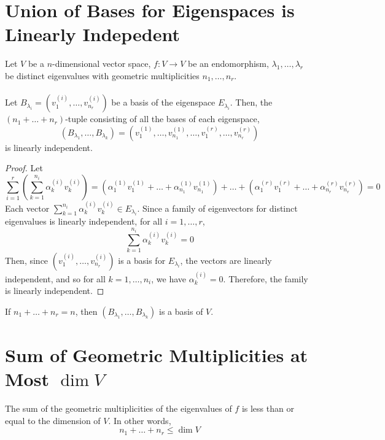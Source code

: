 \documentclass[letterpaper,12pt]{article}
\begin{document}
\section*{Union of Bases for Eigenspaces is Linearly Indepedent}
\begin{lemma}
Let $V$ be a $n$-dimensional vector space, $f: V \rightarrow V$ be an endomorphism, $\lambda_1, \dots, \lambda_r$ be distinct eigenvalues with geometric multiplicities $n_1, \dots, n_r$.
\\ \\ Let $B_{\lambda_i} = (v_{1}^{(i)}, \dots, v_{n_r}^{(i)})$ be a basis of the eigenspace $E_{\lambda_i}$. Then, the $(n_1 + \dots + n_r)$-tuple consisting of all the bases of each eigenspace,
\begin{equation*}
    (B_{\lambda_1}, \dots, B_{\lambda_k}) = (v_{1}^{(1)}, \dots, v_{n_1}^{(1)}, \dots, v_{1}^{(r)}, \dots, v_{n_r}^{(r)})
\end{equation*}
is linearly independent.
\end{lemma}


\begin{proof}
Let
\begin{equation*}
    \sum_{i=1}^{r} \left( \sum_{k=1}^{n_{i}} \alpha_{k}^{(i)} v_{k}^{(i)} \right) = (\alpha_{1}^{(1)} v_{1}^{(1)} + \dots + \alpha_{n_1}^{(1)} v_{n_1}^{(1)}) + \dots + (\alpha_{1}^{(r)} v_{1}^{(r)} + \dots + \alpha_{n_r}^{(r)} v_{n_r}^{(r)}) = 0
\end{equation*}
Each vector $\sum_{k=1}^{n_i} \alpha_{k}^{(i)} v_{k}^{(i)} \in E_{\lambda_{i}}$. Since a family of eigenvectors for distinct eigenvalues is linearly independent, for all $i = 1, \dots, r$,
\begin{equation*}
    \sum_{k=1}^{n_i} \alpha_{k}^{(i)} v_{k}^{(i)} = 0
\end{equation*}
Then, since $(v_{1}^{(i)}, \dots, v_{n_r}^{(i)})$ is a basis for $E_{\lambda_{i}}$, the vectors are linearly independent, and so for all $k = 1, \dots, n_{i}$, we have $\alpha_{k}^{(i)} = 0$. Therefore, the family is linearly independent.
\end{proof}

\begin{corollary}
If $n_1 + \dots + n_r = n$, then $(B_{\lambda_1}, \dots, B_{\lambda_k})$ is a basis of $V$.
\end{corollary}

\section*{Sum of Geometric Multiplicities at Most $\dim{V}$}
\begin{theorem}
The sum of the geometric multiplicities of the eigenvalues of $f$ is less than or equal to the dimension of $V$. In other words,
\begin{equation*}
    n_1 + \dots + n_{r} \leq \dim{V}
\end{equation*}
\end{theorem}
\end{document}
